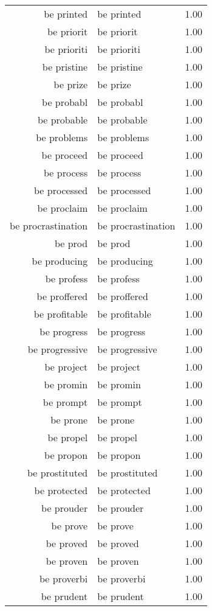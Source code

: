 \begin{table}[ht]
\begin{tabular}{rlr}
  be printed & be printed & 1.00 \\ 
  be priorit & be priorit & 1.00 \\ 
  be prioriti & be prioriti & 1.00 \\ 
  be pristine & be pristine & 1.00 \\ 
  be prize & be prize & 1.00 \\ 
  be probabl & be probabl & 1.00 \\ 
  be probable & be probable & 1.00 \\ 
  be problems & be problems & 1.00 \\ 
  be proceed & be proceed & 1.00 \\ 
  be process & be process & 1.00 \\ 
  be processed & be processed & 1.00 \\ 
  be proclaim & be proclaim & 1.00 \\ 
  be procrastination & be procrastination & 1.00 \\ 
  be prod & be prod & 1.00 \\ 
  be producing & be producing & 1.00 \\ 
  be profess & be profess & 1.00 \\ 
  be proffered & be proffered & 1.00 \\ 
  be profitable & be profitable & 1.00 \\ 
  be progress & be progress & 1.00 \\ 
  be progressive & be progressive & 1.00 \\ 
  be project & be project & 1.00 \\ 
  be promin & be promin & 1.00 \\ 
  be prompt & be prompt & 1.00 \\ 
  be prone & be prone & 1.00 \\ 
  be propel & be propel & 1.00 \\ 
  be propon & be propon & 1.00 \\ 
  be prostituted & be prostituted & 1.00 \\ 
  be protected & be protected & 1.00 \\ 
  be prouder & be prouder & 1.00 \\ 
  be prove & be prove & 1.00 \\ 
  be proved & be proved & 1.00 \\ 
  be proven & be proven & 1.00 \\ 
  be proverbi & be proverbi & 1.00 \\ 
  be prudent & be prudent & 1.00 \\ 

\end{tabular}
\end{table}
